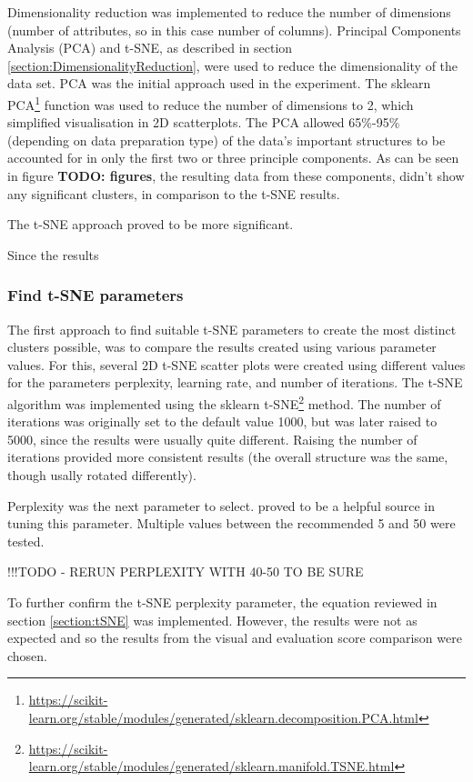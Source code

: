 
Dimensionality reduction was implemented to reduce the number of dimensions (number of attributes, so in this case number of columns). Principal Components Analysis (PCA) and t-SNE, as described in section \ref{section:DimensionalityReduction}, were used to reduce the dimensionality of the data set. PCA was the initial approach used in the experiment. The sklearn PCA\footnote{\url{https://scikit-learn.org/stable/modules/generated/sklearn.decomposition.PCA.html}} function was used to reduce the number of dimensions to 2, which simplified visualisation in 2D scatterplots. The PCA allowed 65\%-95\% (depending on data preparation type) of the data's important structures to be accounted for in only the first two or three principle components. As can be seen in figure \textbf{TODO: figures}, the resulting data from these components, didn't show any significant clusters, in comparison to the t-SNE results.

The t-SNE approach proved to be more significant.

Since the results 


\subsubsection{Find t-SNE parameters}
The first approach to find suitable t-SNE parameters to create the most distinct clusters possible, was to compare the results created using various parameter values. For this, several 2D t-SNE scatter plots were created using different values for the parameters perplexity, learning rate, and number of iterations. The t-SNE algorithm was implemented using the sklearn t-SNE\footnote{\url{https://scikit-learn.org/stable/modules/generated/sklearn.manifold.TSNE.html}} method. The number of iterations was originally set to the default value 1000, but was later raised to 5000, since the results were usually quite different. Raising the number of iterations provided more consistent results (the overall structure was the same, though usally rotated differently). 

Perplexity was the next parameter to select. \textcite{wattenberg2016how} proved to be a helpful source in tuning this parameter. Multiple values between the recommended 5 and 50 were tested. 

!!!TODO - RERUN PERPLEXITY WITH 40-50 TO BE SURE







To further confirm the t-SNE perplexity parameter, the equation reviewed in section \ref{section:tSNE} was implemented. However, the results were not as expected and so the results from the visual and evaluation score comparison were chosen.
